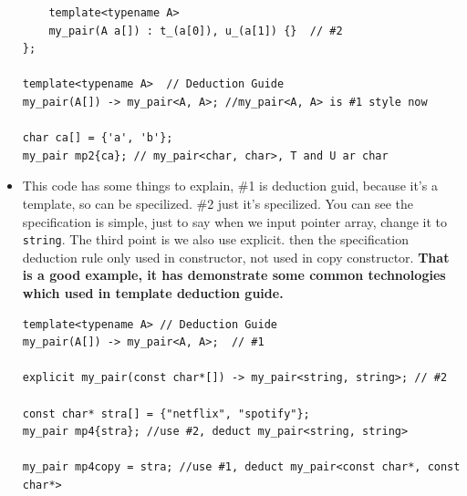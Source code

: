 \documentclass[a4paper,11pt,twoside]{book}
\begin{document}
\begin{itemize}
\begin{lstlisting}
	template<typename A>
	my_pair(A a[]) : t_(a[0]), u_(a[1]) {}  // #2
};

template<typename A>  // Deduction Guide
my_pair(A[]) -> my_pair<A, A>; //my_pair<A, A> is #1 style now

char ca[] = {'a', 'b'};
my_pair mp2{ca}; // my_pair<char, char>, T and U ar char
\end{lstlisting}

    \item This code has some things to explain, \#1 is deduction guid, because it's a template, so can be specilized. \#2 just it's specilized. You can see the specification is simple, just to say when we input pointer array, change it to \texttt{string}. The third point is we also use explicit. then the specification deduction rule only used in constructor, not used in copy constructor. \textbf{That is a good example, it has demonstrate some common technologies which used in template deduction guide.}

\begin{lstlisting}
template<typename A> // Deduction Guide
my_pair(A[]) -> my_pair<A, A>;  // #1

explicit my_pair(const char*[]) -> my_pair<string, string>; // #2

const char* stra[] = {"netflix", "spotify"};
my_pair mp4{stra}; //use #2, deduct my_pair<string, string>

my_pair mp4copy = stra; //use #1, deduct my_pair<const char*, const char*>
\end{lstlisting}

\end{itemize}
\end{document}
